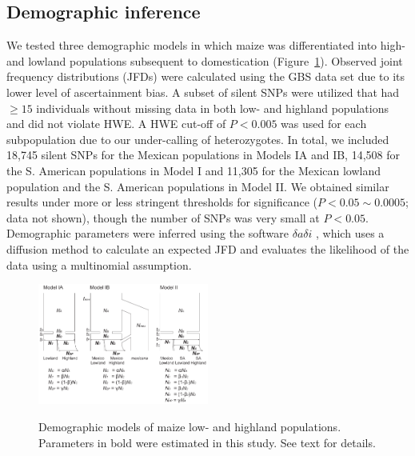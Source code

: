 \subsection*{Demographic inference}
We tested three demographic models in which maize was differentiated into high- and lowland populations subsequent to domestication (Figure~\ref{model}). 
Observed joint frequency distributions (JFDs) were calculated using the GBS data set due to its lower level of ascertainment bias. 
A subset of silent  SNPs were utilized that had $\geq15$ individuals without missing data in both low- and highland populations and did not violate HWE.  
A HWE cut-off of $P<0.005$ was used for each subpopulation due to our under-calling of heterozygotes. 
In total, we included 18,745 silent SNPs for the Mexican populations in Models IA and IB, 14,508 for the S. American populations in Model I and 11,305 for the Mexican lowland population and the S. American populations in Model II.  
We obtained similar results under more or less stringent thresholds for significance ($P < 0.05\sim0.0005$; data not shown), though the number of SNPs was very small at $P<0.05$.  
Demographic parameters were inferred using the software $\delta a \delta i$ \cite[]{Gutenkunst_2009_19851460}, which uses a diffusion method to calculate an expected JFD and evaluates the likelihood of the data using a multinomial assumption.

\begin{figure}[tb]   
  \begin{center}
   \vspace{-0mm}
   \includegraphics[width=0.5\textwidth]{fig/Fig3}
   \renewcommand{\baselinestretch}{0.9}
   \vspace{-3mm}
   \caption{ Demographic models of maize low- and highland populations.  Parameters in bold were estimated in this study.  See text for details.
   }
\vspace{-6mm}
    \label{model}
  \end{center}
\end{figure}

